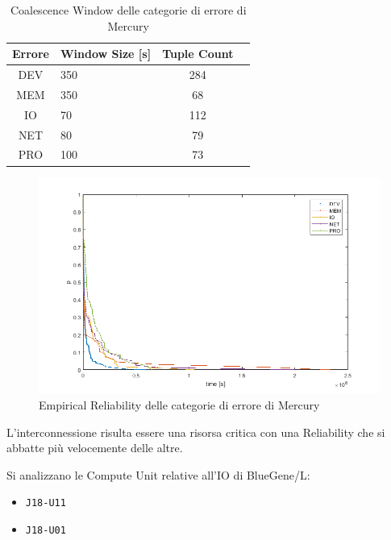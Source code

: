 		\begin{table}
			\footnotesize
			\caption{Coalescence Window delle categorie di errore di Mercury}
			\label{tab:ffda-cMcwin}
			\centering
			\begin{tabular}{clcc}
				\toprule
				\textbf{Errore} &
				\textbf{Window Size [s]} &
				\textbf{Tuple Count}\\
				\midrule
				DEV &
				350 &
				284\\
				\midrule
				MEM &
				350 &
				68\\
				\midrule
				IO &
				70 &
				112\\
				\midrule
				NET &
				80 &
				79\\
				\midrule
				PRO &
				100 &
				73\\
				\bottomrule			
			\end{tabular}
		\end{table}
		
		\begin{figure}[H]
			\centering
			\includegraphics[scale=0.7]{./immagine/categorieMrel.png}
			\caption{Empirical Reliability delle categorie di errore di Mercury}
			\label{fig:ffda-cMrel}
		\end{figure}
	
		L'interconnessione risulta essere una risorsa critica con una Reliability che si abbatte più velocemente delle altre.\par
		Si analizzano le Compute Unit relative all'IO di BlueGene/L:
		\begin{itemize}
			\item \texttt{J18-U11}
			\item \texttt{J18-U01}
		\end{itemize}
		
